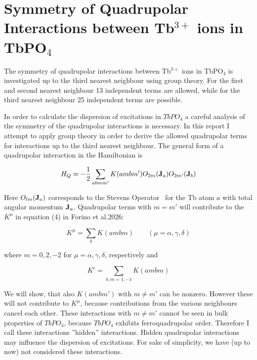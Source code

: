 \section{Symmetry of Quadrupolar Interactions between Tb$^{3+}$ ions in TbPO$_4$}\label{qintTbPO4}

The symmetry of quadrupolar interactions between Tb$^{3+}$ ions in TbPO$_4$ is investigated
up to the third nearest neighbour using group theory.
 For the first and second nearest neighbour
13 independent terms are allowed, while for the third nearest neighbour  25 independent terms
are possible. 

In order to calculate the dispersion of excitations in $TbPO_4$ a careful analysis
of the symmetry of the quadrupolar interactions is necessary. In this report I attempt
to apply group theory in order to derive the allowed quadrupolar terms for interactions
up to the third nearest neighbour.
The general form of a quadrupolar interaction 
in the Hamiltonian is 

\begin{equation}
H_Q=-\frac{1}{2}\sum_{abmm'}K(ambm') O_{2m}(\mathbf J_a)O_{2m'}(\mathbf J_b)
\end{equation}

Here
$O_{lm}(\mathbf J_a)$ corresponds to the Stevens Operator~\cite{hutchings64-227}
for the Tb atom $a$ with total angular momentum $\mathbf J_a$. Quadrupolar terms with
$m=m'$ will contribute to the $K^{\mu}$
 in equation (4) in Forino et al.2026:

\begin{equation}
K^{\mu}=\sum_b K(ambm) \qquad (\mu=\alpha,\gamma,\delta)
\end{equation}

where $m=0,2,-2$ for $\mu=\alpha,\gamma,\delta$, respectively and

\begin{equation}
K^{\epsilon}=\sum_{b,m=1,-1} K(ambm)
\end{equation}

We will show, that also $K(ambm')$ with $m\neq m'$ can be nonzero. However
these will not contribute to $K^{\mu}$, because contributions from 
the various neighbours cancel each other. These interactions
 with $m\neq m'$ cannot be seen in bulk properties of $TbPO_4$, because
$TbPO_4$ exhibits ferroquadrupolar order. Therefore I call these
interactions ''hidden'' interactions. Hidden quadrupolar interactions
may influence the dispersion of excitations. For sake of simplicity,
we have (up to now) not considered these interactions.

